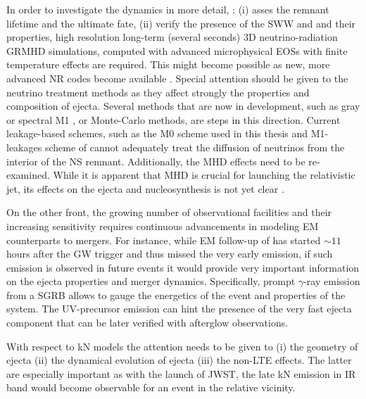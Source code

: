 In order to investigate the \pmerg{} dynamics in more detail, \eg: 
(i) asses the remnant lifetime and the ultimate fate, 
(ii) verify the presence of the \ac{SWW} and \nwind{} and their properties, 
high resolution long-term (several seconds) $3$D neutrino-radiation \ac{GRMHD} 
simulations, computed with advanced microphysical \acp{EOS} with finite temperature effects 
are required.
This might become possible as new, more advanced \ac{NR} codes become available 
\citep[\eg][]{Daszuta:2021ecf}.
Special attention should be given to the neutrino treatment methods as they affect strongly the 
properties and composition of ejecta.
Several methods that are now in development, such as gray or spectral M1 \citep{Foucart:2016rxm,Roberts:2016lzn},
or Monte-Carlo methods, are steps in this direction. 
%
Current leakage-based schemes, such as 
the M0 scheme used in this thesis and M1-leakages scheme of \citet{Sekiguchi:2015dma,Fujibayashi:2017puw}
cannot adequately treat the diffusion of neutrinos from the interior of the
\pmerg{} \ac{NS} remnant.
Additionally, the \ac{MHD} effects need to be re-examined. While it is 
apparent that \ac{MHD} is crucial for launching the relativistic jet, its effects on the 
ejecta and nucleosynthesis is not yet clear \citep{Siegel:2017jug, Fernandez:2018kax}.

On the other front, the growing number of observational facilities and their increasing 
sensitivity requires continuous advancements in modeling \ac{EM} counterparts to mergers.
%
For instance, while \ac{EM} follow-up of \GW{} has started ${\sim}11\,$hours after the 
\ac{GW} trigger and thus missed the very early emission, if such emission is observed 
in future events it would provide very important information on the ejecta properties 
and merger dynamics. 
%
Specifically, prompt $\gamma$-ray emission from a \ac{SGRB} allows to 
gauge the energetics of the event and properties of the system.
The \ac{UV}-precursor emission can hint the presence of the very 
fast ejecta component that can be later verified with afterglow observations. 


With respect to \ac{kN} models the attention needs to be given to 
(i) the geometry of ejecta 
(ii) the dynamical evolution of ejecta 
(iii) the non-\ac{LTE} effects.
%
The latter are especially important as with the launch of \ac{JWST}, 
the late \ac{kN} emission in \ac{IR} band would become observable for an event in the 
relative vicinity.



